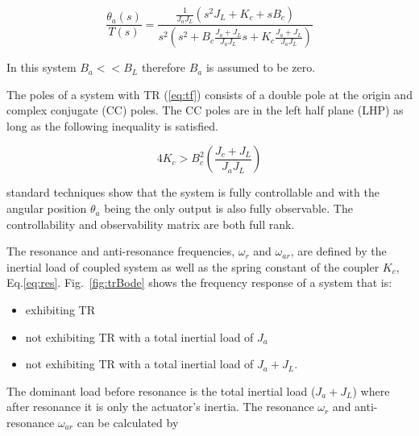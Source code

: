 

\begin{equation}\label{eq:tf}
\frac{\theta_a(s)}{T(s)} = \frac{  \frac{1}{J_aJ_L}\left(s^2J_L+K_c + sB_c\right)  }{s^2 \left( s^2+B_c\frac{J_a+J_L}{J_aJ_L} s + K_c \frac{J_a+J_L}{J_aJ_L} \right)}
\end{equation}

In this system $B_a << B_L$ therefore $B_a$ is assumed to be zero.









The poles of a system with TR (\ref{eq:tf}) consists of a double pole at the origin and complex conjugate (CC) poles.  The CC poles are in the left half plane (LHP) as long as the following inequality is satisfied.

\begin{equation}
4K_c > B_c^2 \left( \frac{J_c+J_L}{J_aJ_L} \right)
\end{equation}





\noindent standard techniques show that the system is fully controllable and with the angular position $\theta_a$ being the only output is also fully observable.  The controllability and observability matrix are both full rank.



The resonance and anti-resonance frequencies, $\omega_r$ and $\omega_{ar}$, are defined by the inertial load of coupled system as well as the spring constant of the coupler $K_c$, Eq.\ref{eq:res}\cite{chmielewski}.
Fig.~\ref{fig:trBode} shows the frequency response of a system that is:
\begin{itemize}
\item exhibiting TR
\item not exhibiting TR with a total inertial load of $J_a$
\item not exhibiting TR with a total inertial load of $J_a+J_L$.  
\end{itemize}
The dominant load before resonance is the total inertial load ($J_a+J_L$) where after resonance it is only the actuator's inertia.  The resonance $\omega_r$ and anti-resonance $\omega_{ar}$ can be calculated by


